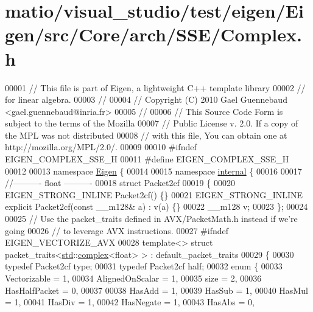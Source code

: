 \hypertarget{matio_2visual__studio_2test_2eigen_2_eigen_2src_2_core_2arch_2_s_s_e_2_complex_8h_source}{}\section{matio/visual\+\_\+studio/test/eigen/\+Eigen/src/\+Core/arch/\+S\+S\+E/\+Complex.h}
\label{matio_2visual__studio_2test_2eigen_2_eigen_2src_2_core_2arch_2_s_s_e_2_complex_8h_source}

\begin{DoxyCode}
00001 \textcolor{comment}{// This file is part of Eigen, a lightweight C++ template library}
00002 \textcolor{comment}{// for linear algebra.}
00003 \textcolor{comment}{//}
00004 \textcolor{comment}{// Copyright (C) 2010 Gael Guennebaud <gael.guennebaud@inria.fr>}
00005 \textcolor{comment}{//}
00006 \textcolor{comment}{// This Source Code Form is subject to the terms of the Mozilla}
00007 \textcolor{comment}{// Public License v. 2.0. If a copy of the MPL was not distributed}
00008 \textcolor{comment}{// with this file, You can obtain one at http://mozilla.org/MPL/2.0/.}
00009 
00010 \textcolor{preprocessor}{#ifndef EIGEN\_COMPLEX\_SSE\_H}
00011 \textcolor{preprocessor}{#define EIGEN\_COMPLEX\_SSE\_H}
00012 
00013 \textcolor{keyword}{namespace }\hyperlink{namespace_eigen}{Eigen} \{
00014 
00015 \textcolor{keyword}{namespace }\hyperlink{namespaceinternal}{internal} \{
00016 
00017 \textcolor{comment}{//---------- float ----------}
00018 \textcolor{keyword}{struct }Packet2cf
00019 \{
00020   EIGEN\_STRONG\_INLINE Packet2cf() \{\}
00021   EIGEN\_STRONG\_INLINE \textcolor{keyword}{explicit} Packet2cf(\textcolor{keyword}{const} \_\_m128& a) : v(a) \{\}
00022   \_\_m128  v;
00023 \};
00024 
00025 \textcolor{comment}{// Use the packet\_traits defined in AVX/PacketMath.h instead if we're going}
00026 \textcolor{comment}{// to leverage AVX instructions.}
00027 \textcolor{preprocessor}{#ifndef EIGEN\_VECTORIZE\_AVX}
00028 \textcolor{keyword}{template}<> \textcolor{keyword}{struct }packet\_traits<\hyperlink{namespacestd}{std}::\hyperlink{structcomplex}{complex}<float> >  : default\_packet\_traits
00029 \{
00030   \textcolor{keyword}{typedef} Packet2cf type;
00031   \textcolor{keyword}{typedef} Packet2cf half;
00032   \textcolor{keyword}{enum} \{
00033     Vectorizable = 1,
00034     AlignedOnScalar = 1,
00035     size = 2,
00036     HasHalfPacket = 0,
00037 
00038     HasAdd    = 1,
00039     HasSub    = 1,
00040     HasMul    = 1,
00041     HasDiv    = 1,
00042     HasNegate = 1,
00043     HasAbs    = 0,

\end{DoxyCode}
